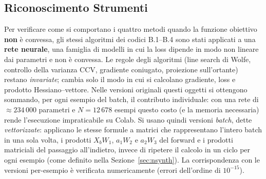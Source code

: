 \documentclass[a4paper,12pt]{article}
\numberwithin{equation}{section}
\numberwithin{figure}{section}
\numberwithin{table}{section}
\begin{document}
\subsection{Riconoscimento Strumenti}\label{sec:nsynth-net}

Per verificare come si comportano i quattro metodi quando la funzione obiettivo
\textbf{non} è convessa, gli stessi algoritmi dei codici B.1--B.4 sono stati
applicati a una \textbf{rete neurale}, una famiglia di modelli in cui la loss
dipende in modo non lineare dai parametri e non è convessa. Le regole degli
algoritmi (line search di Wolfe, controllo della varianza CCV, gradiente
coniugato, proiezione sull'ortante) restano \emph{invariate}; cambia solo il
modo in cui si calcolano gradiente, loss e prodotto Hessiano--vettore. Nelle
versioni originali questi oggetti si ottengono sommando, per ogni esempio del
batch, il contributo individuale: con una rete di $\approx 234\,000$ parametri
e $N = 12\,678$ esempi questo costo (e la memoria necessaria) rende
l'esecuzione impraticabile su Colab. Si usano quindi versioni \emph{batch},
dette \emph{vettorizzate}: applicano le stesse formule a matrici che
rappresentano l'intero batch in una sola volta, i prodotti $X_b W_1$,
$a_1 W_2$ e $a_2 W_3$ del forward e i prodotti matriciali del passaggio
all'indietro, invece di ripetere il calcolo in un ciclo per ogni esempio
(come definito nella Sezione~\ref{sec:nsynth}). La corrispondenza con le
versioni per-esempio è verificata numericamente (errori dell'ordine di
$10^{-15}$).
\end{document}
